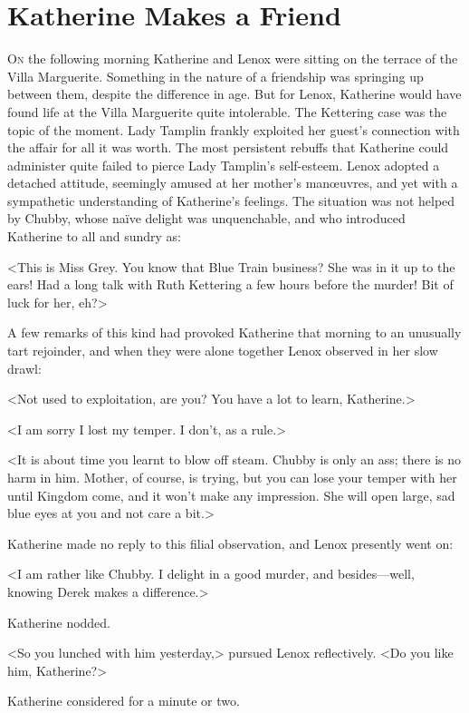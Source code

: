 \chapter{Katherine Makes a Friend}



\lettrine{O}{n} the following morning Katherine and Lenox were sitting on the terrace of the Villa Marguerite. Something in the nature of a friendship was springing up between them, despite the difference in age. But for Lenox, Katherine would have found life at the Villa Marguerite quite intolerable. The Kettering case was the topic of the moment. Lady Tamplin frankly exploited her guest's connection with the affair for all it was worth. The most persistent rebuffs that Katherine could administer quite failed to pierce Lady Tamplin's self-esteem. Lenox adopted a detached attitude, seemingly amused at her mother's manœuvres, and yet with a sympathetic understanding of Katherine's feelings. The situation was not helped by Chubby, whose naïve delight was unquenchable, and who introduced Katherine to all and sundry as:

<This is Miss Grey. You know that Blue Train business? She was in it up to the ears! Had a long talk with Ruth Kettering a few hours before the murder! Bit of luck for her, eh?>

A few remarks of this kind had provoked Katherine that morning to an unusually tart rejoinder, and when they were alone together Lenox observed in her slow drawl:

<Not used to exploitation, are you? You have a lot to learn, Katherine.>

<I am sorry I lost my temper. I don't, as a rule.>

<It is about time you learnt to blow off steam. Chubby is only an ass; there is no harm in him. Mother, of course, is trying, but you can lose your temper with her until Kingdom come, and it won't make any impression. She will open large, sad blue eyes at you and not care a bit.>

Katherine made no reply to this filial observation, and Lenox presently went on:

<I am rather like Chubby. I delight in a good murder, and besides—well, knowing Derek makes a difference.>

Katherine nodded.

<So you lunched with him yesterday,> pursued Lenox reflectively. <Do you like him, Katherine?>

Katherine considered for a minute or two.

